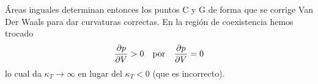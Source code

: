 \documentclass[10pt,oneside]{CBFT_book}
\begin{document}
Áreas inguales determinan entonces los puntos C y G de forma que se corrige Van Der Waals para dar curvaturas
correctas. En la región de coexistencia hemos trocado
\[
	\frac{\partial^{\hspace{-0.05em}} {p}}{\partial {V}^{\hspace{-0.05em}}} > 0 \quad \mathrm{por} \quad \frac{\partial^{\hspace{-0.05em}} {p}}{\partial {V}^{\hspace{-0.05em}}}=0
\]
lo cual da $\kappa_T \to \infty$ en lugar del $\kappa_T < 0$ (que es incorrecto).









\end{document}
